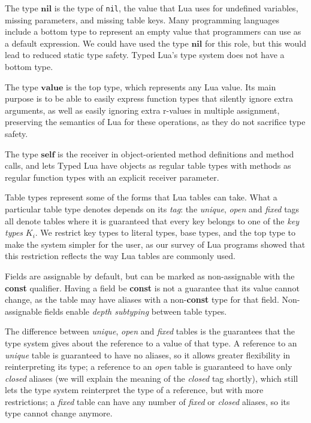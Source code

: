 \documentclass[preprint]{sigplanconf}
\newcommand{\Value}{\mathbf{value}}
\newcommand{\Nil}{\mathbf{nil}}
\newcommand{\Self}{\mathbf{self}}
\begin{document}
The type $\Nil$ is the type of {\tt nil}, the value that Lua uses for undefined variables, missing parameters, and missing table keys.
Many programming languages include a bottom type to represent
an empty value that programmers can use as a default expression.
We could have used the type $\Nil$ for this role, but
this would lead to reduced static type safety. Typed Lua's
type system does not have a bottom type.

The type $\Value$ is the top type, which represents any Lua value.
Its main purpose is to be able to easily express function types
that silently ignore extra arguments, as well as easily ignoring extra r-values in multiple assignment, preserving the semantics of Lua for these operations, as they do not sacrifice type safety.

The type $\Self$ is the receiver in object-oriented method
definitions and method calls, and lets Typed Lua have objects
as regular table types with methods as regular function types
with an explicit receiver parameter.

Table types represent some of the forms that Lua
tables can take. What a particular table type denotes
depends on its {\em tag}: the {\em unique}, {\em open}
and {\em fixed} tags all denote tables where it is
guaranteed that every key belongs to one of the {\em key
types} $K_i$. We restrict key types to literal types,
base types, and the top type to make the system simpler
for the user, as our survey of Lua programs showed that
this restriction reflects the way Lua tables are commonly used.

Fields are assignable by default, but can be marked
as non-assignable with the {\bf const} qualifier. Having
a field be {\bf const} is not a guarantee that its
value cannot change, as the table may have aliases with
a non-{\bf const} type for that field. Non-assignable
fields enable {\em depth subtyping} between table types.

The difference between {\em unique}, {\em open} and
{\em fixed} tables is the guarantees that the type system
gives about the reference to a value of that type. A reference
to an {\em unique} table is guaranteed to have no aliases,
so it allows greater flexibility in reinterpreting its type;
a reference to an {\em open} table is guaranteed to have
only {\em closed} aliases (we will explain the meaning of the {\em closed} tag shortly), which still lets the type system
reinterpret the type of a reference, but with more
restrictions; a {\em fixed} table can have any number of {\em fixed} or {\em closed} aliases, so its type cannot change
anymore.
\end{document}
